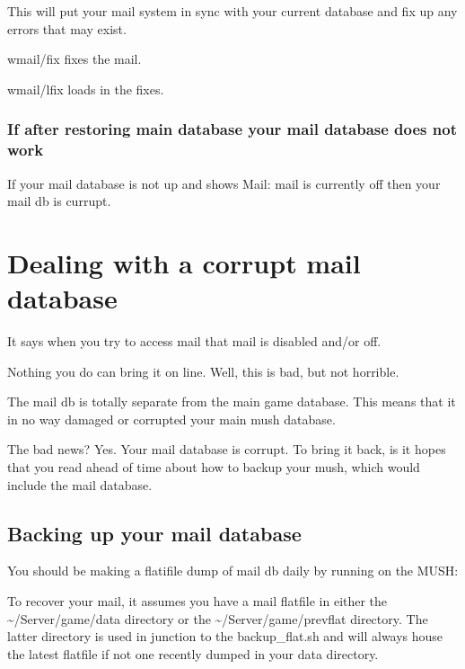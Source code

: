 \documentclass[letterpaper,10pt,english]{sphinxmanual}
\begin{document}
\sphinxAtStartPar
This will put your mail system in sync with your current database and
fix up any errors that may exist.

\sphinxAtStartPar
wmail/fix fixes the mail.

\sphinxAtStartPar
wmail/lfix loads in the fixes.


\subsubsection{If after restoring main database your mail database does not work}
\label{\detokenize{troubleshooting:if-after-restoring-main-database-your-mail-database-does-not-work}}
\sphinxAtStartPar
If your mail database is not up and shows \textquotesingle{}Mail: mail is currently off\textquotesingle{} then your mail db is currupt.


\section{Dealing with a corrupt mail database}
\label{\detokenize{troubleshooting:dealing-with-a-corrupt-mail-database}}
\sphinxAtStartPar
It says when you try to access mail that mail is disabled and/or off.

\sphinxAtStartPar
Nothing you do can bring it on line.  Well, this is bad, but not horrible.

\sphinxAtStartPar
The mail db is totally separate from the main game database.  This means
that it in no way damaged or corrupted your main mush database.

\sphinxAtStartPar
The bad news?  Yes.  Your mail database is corrupt.  To bring it back,
is it hopes that you read ahead of time about how to backup your mush,
which would include the mail database.


\subsection{Backing up your mail database}
\label{\detokenize{troubleshooting:backing-up-your-mail-database}}
\sphinxAtStartPar
You should be making a flatifile dump of mail db daily by running on the MUSH:

\begin{sphinxVerbatim}[commandchars=\\\{\}]
\end{sphinxVerbatim}

\sphinxAtStartPar
To recover your mail, it assumes you have a mail flatfile in either the
\textasciitilde{}/Server/game/data directory or the \textasciitilde{}/Server/game/prevflat directory.  The
latter directory is used in junction to the backup\_flat.sh and will always
house the latest flatfile if not one recently dumped in your data directory.
\end{document}
